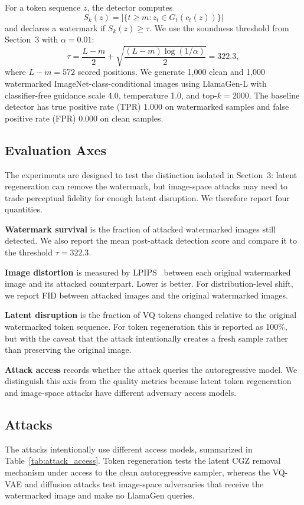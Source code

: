 \documentclass[12pt]{article}
\begin{document}
For a token sequence $z$, the detector computes
\[
S_k(z)=|\{t\ge m: z_t\in G_t(c_t(z))\}|
\]
and declares a watermark if $S_k(z)\ge \tau$. We use the soundness
threshold from Section~3 with $\alpha=0.01$:
\[
\tau = \frac{L-m}{2}+\sqrt{\frac{(L-m)\log(1/\alpha)}{2}}
=322.3,
\]
where $L-m=572$ scored positions. We generate 1,000 clean and 1,000
watermarked ImageNet-class-conditional images using LlamaGen-L with
classifier-free guidance scale 4.0, temperature 1.0, and top-$k=2000$.
The baseline detector has true positive rate (TPR) 1.000 on watermarked
samples and false positive rate (FPR) 0.000 on clean samples.

\subsection{Evaluation Axes}

The experiments are designed to test the distinction isolated in
Section~3: latent regeneration can remove the watermark, but
image-space attacks may need to trade perceptual fidelity for enough
latent disruption. We therefore report four quantities.

\textbf{Watermark survival} is the fraction of attacked watermarked
images still detected. We also report the mean post-attack detection
score and compare it to the threshold $\tau=322.3$.

\textbf{Image distortion} is measured by LPIPS~\cite{lpips2018} between
each original watermarked image and its attacked counterpart. Lower is
better. For distribution-level shift, we report FID between attacked
images and the original watermarked images.

\textbf{Latent disruption} is the fraction of VQ tokens changed relative
to the original watermarked token sequence. For token regeneration this
is reported as 100\%, but with the caveat that the attack intentionally
creates a fresh sample rather than preserving the original image.

\textbf{Attack access} records whether the attack queries the
autoregressive model. We distinguish this axis from the quality metrics
because latent token regeneration and image-space attacks have different
adversary access models.

\subsection{Attacks}

The attacks intentionally use different access models, summarized in
Table~\ref{tab:attack_access}. Token regeneration tests the latent CGZ
removal mechanism under access to the clean autoregressive sampler,
whereas the VQ-VAE and diffusion attacks test image-space adversaries
that receive the watermarked image and make no LlamaGen queries.
\end{document}
